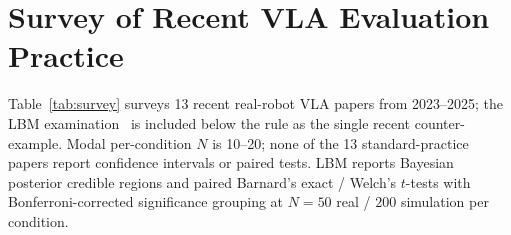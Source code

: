 \documentclass{article}
\begin{document}
\appendix
\section{Survey of Recent VLA Evaluation Practice}\label{app:survey}

Table~\ref{tab:survey} surveys 13 recent real-robot VLA papers from 2023--2025; the LBM examination~\cite{lbm2026} is included below the rule as the single recent counter-example. Modal per-condition $N$ is 10--20; none of the 13 standard-practice papers report confidence intervals or paired tests. LBM reports Bayesian posterior credible regions and paired Barnard's exact / Welch's $t$-tests with Bonferroni-corrected significance grouping at $N{=}50$ real / $200$ simulation per condition.
\end{document}

